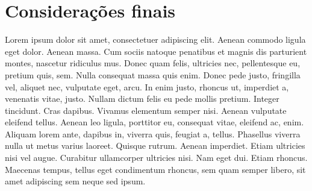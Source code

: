 \chapter*[Considerações finais]{Considerações finais}

	Lorem ipsum dolor sit amet, consectetuer adipiscing 
	elit. Aenean commodo ligula eget dolor. Aenean massa.
	Cum sociis natoque penatibus et magnis dis parturient
	montes, nascetur ridiculus mus. Donec quam felis, 
	ultricies nec, pellentesque eu, pretium quis, sem. 
	Nulla consequat massa quis enim. Donec pede justo, 
	fringilla vel, aliquet nec, vulputate eget, arcu. In 
	enim justo, rhoncus ut, imperdiet a, venenatis vitae,
	justo. Nullam dictum felis eu pede mollis pretium. 
	Integer tincidunt. Cras dapibus. Vivamus elementum 
	semper nisi. Aenean vulputate eleifend tellus. Aenean 
	leo ligula, porttitor eu, consequat vitae, eleifend 
	ac, enim. Aliquam lorem ante, dapibus in, viverra 
	quis, feugiat a, tellus. Phasellus viverra nulla ut 
	metus varius laoreet. Quisque rutrum. Aenean imperdiet.
	Etiam ultricies nisi vel augue. Curabitur ullamcorper 
	ultricies nisi. Nam eget dui. Etiam rhoncus. Maecenas 
	tempus, tellus eget condimentum rhoncus, sem quam 
	semper libero, sit amet adipiscing sem neque sed ipsum.

    \newpage
